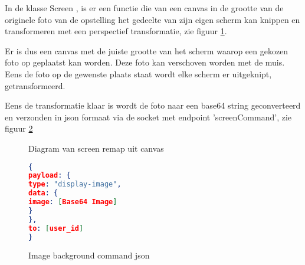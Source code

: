 



In de klasse Screen , is er een functie die van een canvas in de grootte van de originele foto van de opstelling het gedeelte van zijn eigen scherm kan knippen en transformeren met een perspectief transformatie, zie figuur \ref{remapDiagram}.

Er is dus een canvas met de juiste grootte van het scherm waarop een gekozen foto op geplaatst kan worden. Deze foto kan verschoven worden met de muis. Eens de foto op de gewenste plaats staat wordt elke scherm er uitgeknipt, getransformeerd.

Eens de transformatie klaar is wordt de foto naar een base64 string geconverteerd en verzonden in json formaat via de socket met endpoint 'screenCommand', zie figuur \ref{json}

\vspace{30px}

\begin{figure}
\caption{Diagram van screen remap uit canvas} \label{remapDiagram}
\end{figure}

\begin{figure}
\begin{lstlisting}[language=json,firstnumber=1]
{
payload: {
type: "display-image",
data: {
image: [Base64 Image]
}
},
to: [user_id]
}
\end{lstlisting}
\caption{Image background command json} \label{json}
\end{figure}


